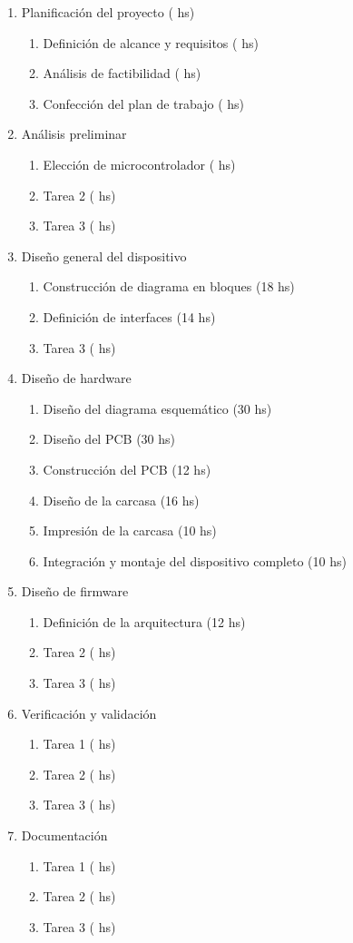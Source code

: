 \documentclass[
11pt, %
codirector, %
]{charter}
\begin{document}
\begin{enumerate}
\item Planificación del proyecto ( hs)
	\begin{enumerate}
	\item Definición de alcance y requisitos ( hs)
	\item Análisis de factibilidad ( hs)
	\item Confección del plan de trabajo ( hs)
	\end{enumerate}
\item Análisis preliminar
	\begin{enumerate}
	\item Elección de microcontrolador ( hs)
	\item Tarea 2 ( hs)
	\item Tarea 3 ( hs)
	\end{enumerate}
\item Diseño general del dispositivo
	\begin{enumerate}
	\item Construcción de diagrama en bloques (18 hs)
	\item Definición de interfaces (14 hs)
	\item Tarea 3 ( hs)
	\end{enumerate}
\item Diseño de hardware
	\begin{enumerate}
	\item Diseño del diagrama esquemático (30 hs)
	\item Diseño del PCB (30 hs)
	\item Construcción del PCB (12 hs)
	\item Diseño de la carcasa (16 hs)
	\item Impresión de la carcasa (10 hs)
	\item Integración y montaje del dispositivo completo (10 hs)
	\end{enumerate}
\item Diseño de firmware
	\begin{enumerate}
	\item Definición de la arquitectura (12 hs)
	\item Tarea 2 ( hs)
	\item Tarea 3 ( hs)
	\end{enumerate}
\item Verificación y validación
	\begin{enumerate}
	\item Tarea 1 ( hs)
	\item Tarea 2 ( hs)
	\item Tarea 3 ( hs)
	\end{enumerate}
\item Documentación
	\begin{enumerate}
	\item Tarea 1 ( hs)
	\item Tarea 2 ( hs)
	\item Tarea 3 ( hs)
	\end{enumerate}
\end{enumerate}
\end{document}
